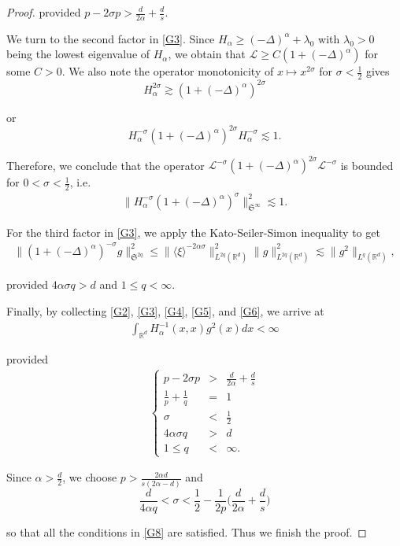 \documentclass[%
11pt,  reqno]{amsart}
\theoremstyle{remarkstyle}
\newcommand{\1}{\hspace{0.2mm}\text{I}\hspace{0.2mm}}
\newcommand{\noi}{\noindent}
\newcommand{\R}{\mathbb{R}}
\renewcommand{\L}{\mathcal{L}}
\newcommand{\al}{\alpha}
\newcommand{\ld}{\lambda}
\newcommand{\s}{\sigma}
\newcommand{\les}{\lesssim}
\newcommand{\ges}{\gtrsim}
\newcommand{\jb}[1]
{\langle #1 \rangle}
\numberwithin{equation}{section}
\numberwithin{theorem}{section}
\begin{document}
\begin{proof}
		\noi 
		provided $p - 2\s p > \frac{d}{2\al} + \frac{d}s $.
		
		We turn to the second factor in \eqref{G3}.
		Since $H_\al \ge (-\Delta)^\al + \ld_0 $
		with $\ld_0 > 0$ being the lowest eigenvalue of $H_\al$, we obtain that $\L \ge C (1 + (-\Delta)^\al)$ for some $C > 0$.
		We also note the operator monotonicity of $x \mapsto x^{2\s}$ for $\s < \frac12$ gives
		\[
		H_\al^{2\s} \ges (1+ (-\Delta)^\al)^{2\s}
		\]
		
		\noi 
		or 
		\[
		H_\al^{-\s} (1 + (-\Delta)^\al)^{2\s} H_\al^{-\s} \les 1.
		\]
		
		\noi 
		Therefore, we conclude that the operator $\L^{-\s} (1 + (-\Delta)^\al)^{2\s} \L^{-\s}$ is bounded for $0 < \s < \frac12$, i.e.
		\begin{align}
			\label{G5}
			\big\|  H_\al^{-\s} (1+ (-\Delta)^\al)^{ \s}\big\|_{\mathfrak S^\infty}^2 \les 1.
		\end{align}
		
		For the third factor in \eqref{G3},
		we apply the Kato-Seiler-Simon inequality to get
		\begin{align}
			\label{G6}
			\big\| (1+ (-\Delta)^\al)^{ - \s} g\big\|_{\mathfrak S^{2q}}^2 \le \| \jb{\xi}^{-2\al \s} \|_{L^{2q}({\R^d})}^2  \| g\|_{L^{2q} ({\R^d})}^2 \les \| g^2\|_{L^{q} ({\R^d})},
		\end{align}
		
		\noi 
		provided $4\al \s q > d$ and $1 \le q < \infty$.
		
		Finally, by collecting \eqref{G2}, \eqref{G3}, \eqref{G4}, \eqref{G5}, and \eqref{G6}, we arrive at
		\begin{align}
			\label{G7}
			\int_{\R^d} H_\al^{-1}  (x,x) g^2(x) dx < \infty
		\end{align} 
		
		\noi 
		provided 
		\begin{align}
			\label{G8}
			\left\{
			\begin{array}{rcl}
				p - 2\s p &>& \frac{d}{2\al} + \frac{d}s\\
				\frac1p + \frac1q &=& 1\\
				\s &<& \frac12\\
				4\al \s q &>& d\\
				1\le q &<& \infty.
			\end{array}
			\right.
		\end{align}
		
		\noi 
		Since $\al>\frac{d}{2}$, we choose $p > \frac{2\al d}{s(2\al - d)}$ and 
		\[
		\frac{d}{4\al q} < \s < \frac12 - \frac{1}{2p} \bigg( \frac{d}{2\al} + \frac{d}s \bigg)
		\]
		
		\noi 
		so that all the conditions in \eqref{G8} are satisfied.
		Thus we finish the proof.
	\end{proof}
	
\end{document}
